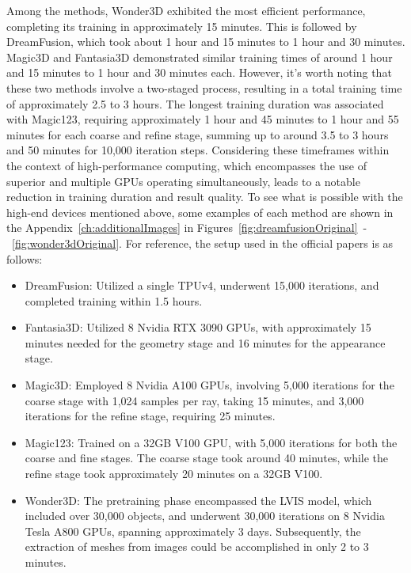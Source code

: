 Among the methods, Wonder3D exhibited the most efficient performance, completing its training in approximately 15 minutes. This is followed by DreamFusion, which took about 1 hour and 15 minutes to 1 hour and 30 minutes. Magic3D and Fantasia3D demonstrated similar training times of around 1 hour and 15 minutes to 1 hour and 30 minutes each. However, it's worth noting that these two methods involve a two-staged process, resulting in a total training time of approximately 2.5 to 3 hours. The longest training duration was associated with Magic123, requiring approximately 1 hour and 45 minutes to 1 hour and 55 minutes for each coarse and refine stage, summing up to around 3.5 to 3 hours and 50 minutes for 10,000 iteration steps. 
Considering these timeframes within the context of high-performance computing, which encompasses the use of superior and multiple GPUs operating simultaneously, leads to a notable reduction in training duration and result quality. To see what is possible with the high-end devices mentioned above, some examples of each method are shown in the Appendix~\ref{ch:additionalImages} in Figures~\ref{fig:dreamfusionOriginal}~-~\ref{fig:wonder3dOriginal}. For reference, the setup used in the official papers is as follows:

\begin{itemize}
    \item DreamFusion: Utilized a single TPUv4, underwent 15,000 iterations, and completed training within 1.5 hours.
    
    \item Fantasia3D\@: Utilized 8 Nvidia RTX 3090 GPUs, with approximately 15 minutes needed for the geometry stage and 16 minutes for the appearance stage.
    
    \item Magic3D\@: Employed 8 Nvidia A100 GPUs, involving 5,000 iterations for the coarse stage with 1,024 samples per ray, taking 15 minutes, and 3,000 iterations for the refine stage, requiring 25 minutes.
    
    \item Magic123: Trained on a 32GB V100 GPU, with 5,000 iterations for both the coarse and fine stages. The coarse stage took around 40 minutes, while the refine stage took approximately 20 minutes on a 32GB V100.
    
    \item Wonder3D\@: The pretraining phase encompassed the LVIS model, which included over 30,000 objects, and underwent 30,000 iterations on 8 Nvidia Tesla A800 GPUs, spanning approximately 3 days. Subsequently, the extraction of meshes from images could be accomplished in only 2 to 3 minutes.
\end{itemize}

